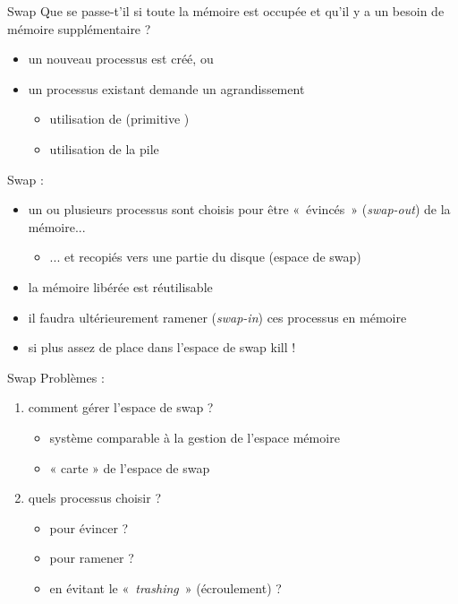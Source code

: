 \begin {frame} {Swap}
    Que se passe-t'il si toute la mémoire est occupée et qu'il y a un
    besoin de mémoire supplémentaire ?
    \begin {itemize}
	\item un nouveau processus est créé, ou
	\item un processus existant demande un agrandissement
	    \begin {itemize}
		\item utilisation de  (primitive )
		\item utilisation de la pile
	    \end {itemize}
    \end {itemize}

    \vspace* {3mm}
    
    Swap :

    \begin {itemize}
	\item un ou plusieurs processus sont choisis pour être
	    «~évincés~» (\textit {swap-out}) de la mémoire...

	    \begin {itemize}
		\item ... et recopiés vers une partie du disque
		    (espace de swap)
	    \end {itemize}

	\item la mémoire libérée est réutilisable

	\item il faudra ultérieurement ramener (\textit {swap-in})
	    ces processus en mémoire

	\item si plus assez de place dans l'espace de swap \implique kill !

    \end {itemize}
\end {frame}

\begin {frame} {Swap}
    Problèmes :
    \begin {enumerate}
	\item comment gérer l'espace de swap ?
	    \begin {itemize}
		\item système comparable à la gestion de l'espace mémoire
		\item \implique « carte » de l'espace de swap
	    \end {itemize}
	\item quels processus choisir ?
	    \begin {itemize}
		\item pour évincer ?
		\item pour ramener ?
		\item en évitant le «~\textit {trashing}~» (écroulement) ?
	    \end {itemize}
    \end {enumerate}
\end {frame}

